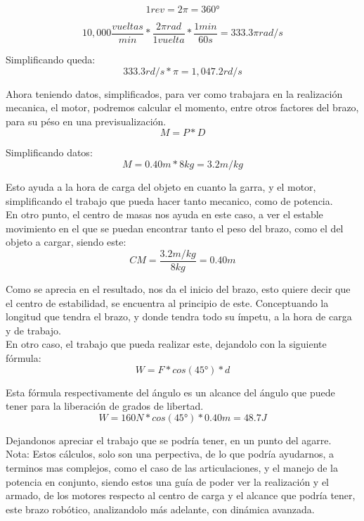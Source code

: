 \documentclass[14pt,a4paper]{article}
\begin{document}
$$ 1rev=2\pi=360°$$

$$ 10,000 \frac{vueltas}{min}*\dfrac{2\pi rad}{1 vuelta}*\frac{1 min}{60s}= 333.3 \pi rad/s $$

Simplificando \pi queda:\\

$$ 333.3 rd/s* \pi= 1,047.2 rd/s $$

Ahora teniendo datos, simplificados, para ver como trabajara en la realización mecanica, el motor, podremos calcular el momento, entre otros factores del brazo, para su péso en una previsualización.\\

$$ M= P*D $$

Simplificando datos:\\

$$ M=0.40m*8kg= 3.2 m/kg $$

Esto ayuda a la hora de carga del objeto en cuanto la garra, y el motor, simplificando el trabajo que pueda hacer tanto mecanico, como de potencia.\\
En otro punto, el centro de masas nos ayuda en este caso, a ver el estable movimiento en el que se puedan encontrar tanto el peso del brazo, como el del objeto a cargar, siendo este:\\

$$ CM=\frac{3.2 m/kg}{8kg}= 0.40m $$

Como se aprecia en el resultado, nos da el inicio del brazo, esto quiere decir que el centro de estabilidad, se encuentra al principio de este. Conceptuando la longitud que tendra el brazo, y donde tendra todo su ímpetu, a la hora de carga y de trabajo.\\
En otro caso, el trabajo que pueda realizar este, dejandolo con la siguiente fórmula:\\

$$ W= F*cos(45°)*d $$

Esta fórmula respectivamente del ángulo es un alcance del ángulo que puede tener para la liberación de grados de libertad.\\

$$ W= 160N*cos(45°)*0.40m= 48.7 J $$

Dejandonos apreciar el trabajo que se podría tener, en un punto del agarre.\\

Nota: Estos cálculos, solo son una perpectiva, de lo que podría ayudarnos, a terminos mas complejos, como el caso de las articulaciones, y el manejo de la potencia en conjunto, siendo estos una guía de poder ver la realización y el armado, de los motores respecto al centro de carga y el alcance que podría tener, este brazo robótico, analizandolo más adelante, con dinámica avanzada.\\
\end{document}
